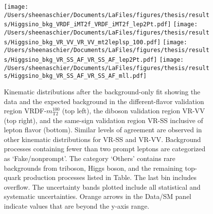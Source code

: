  \begin{figure}%
  \begin{center}
  \texttt{[image: /Users/sheenaschier/Documents/LaFiles/figures/thesis/results/Higgsino\_bkg\_VRDF\_iMT2f\_VRDF\_iMT2f\_lep2Pt.pdf]}
  \texttt{[image: /Users/sheenaschier/Documents/LaFiles/figures/thesis/results/Higgsino\_bkg\_VR\_VV\_VR\_VV\_mt2leplsp\_100.pdf]}
   \texttt{[image: /Users/sheenaschier/Documents/LaFiles/figures/thesis/results/Higgsino\_bkg\_VR\_SS\_AF\_VR\_SS\_AF\_lep2Pt.pdf]}
   \texttt{[image: /Users/sheenaschier/Documents/LaFiles/figures/thesis/results/Higgsino\_bkg\_VR\_SS\_AF\_VR\_SS\_AF\_mll.pdf]}
   \end{center}
 \caption{Kinematic distributions after the background-only fit showing the data and the expected background in the different-flavor validation region VRDF-$m_\text{T2}^{100}$ (top left), the diboson validation region VR-VV (top right), and the same-sign validation region VR-SS inclusive of lepton flavor (bottom).  Similar levels of agreement are observed in other kinematic distributions for VR-SS and VR-VV.  Background processes containing fewer than two prompt leptons are categorized as `Fake/nonprompt'.  The category `Others' contains rare backgrounds from triboson, Higgs boson, and the remaining top-quark production processes listed in Table.  The last bin includes overflow. The uncertainty bands plotted include all statistical and systematic uncertainties. Orange arrows in the Data/SM panel indicate values that are beyond the y-axis range.}
 \label{fig:postfitplots}
 \end{figure}
 

